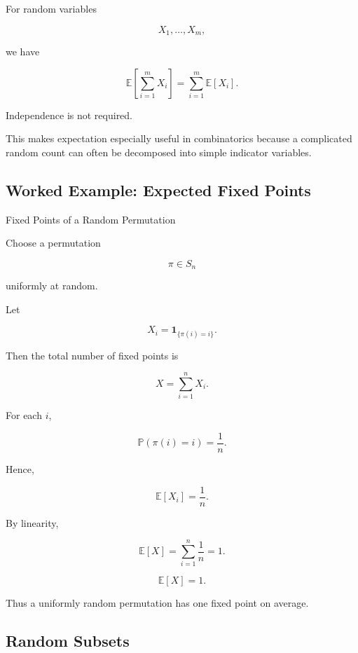 \begin{theorem}
For random variables

\[
X_1,\ldots,X_m,
\]

we have

\[
\boxed{
\mathbb{E}
\left[
\sum_{i=1}^{m}X_i
\right]
=
\sum_{i=1}^{m}\mathbb{E}[X_i].
}
\]
\end{theorem}

Independence is not required.

This makes expectation especially useful in combinatorics because a
complicated random count can often be decomposed into simple indicator
variables.

\subsection{Worked Example: Expected Fixed Points}
\label{subsec:worked-expected-fixed-points}

\begin{workedexamplebox}{Fixed Points of a Random Permutation}

Choose a permutation

\[
\pi\in S_n
\]

uniformly at random.

Let

\[
X_i
=
\mathbf{1}_{\{\pi(i)=i\}}.
\]

Then the total number of fixed points is

\[
X
=
\sum_{i=1}^{n}X_i.
\]

For each \(i\),

\[
\mathbb{P}(\pi(i)=i)
=
\frac1n.
\]

Hence,

\[
\mathbb{E}[X_i]
=
\frac1n.
\]

By linearity,

\[
\mathbb{E}[X]
=
\sum_{i=1}^{n}\frac1n
=
1.
\]

\begin{answerbox}
\[
\boxed{
\mathbb{E}[X]=1.
}
\]
\end{answerbox}

Thus a uniformly random permutation has one fixed point on average.

\end{workedexamplebox}

\subsection{Random Subsets}
\label{subsec:random-subsets}

